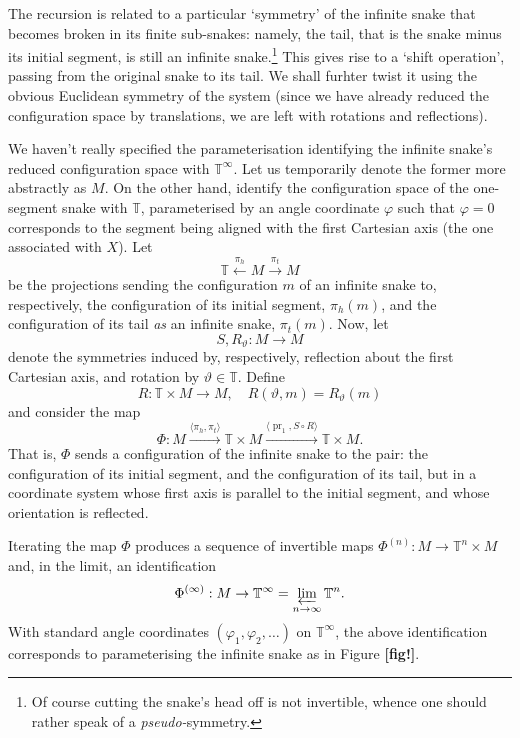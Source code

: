 \documentclass{article}
\def\TT{\mathbb{T}}
\DeclareMathOperator{\pr}{\mathrm{pr}}
\begin{document}
The recursion is related
to a particular `symmetry' of the infinite snake that becomes broken
in its finite sub-snakes:
namely, the tail, that is the
snake minus its initial segment,
is still an infinite snake.\footnote{Of course cutting the snake's head off
is not invertible, whence one should rather speak of a \emph{pseudo-}symmetry.}
This gives rise to a `shift operation', passing from the original snake to its
tail. We shall furhter twist it using the obvious Euclidean symmetry of the system
(since we have already reduced the configuration space by translations,
we are left with rotations and reflections). 

We haven't really specified the parameterisation identifying the infinite snake's
reduced configuration space with $\TT^\infty$. Let us temporarily denote the
former more abstractly as $M$. On the other hand, identify the configuration space
of the one-segment snake with $\TT$, parameterised by an angle coordinate $\varphi$
such that $\varphi=0$ corresponds to the segment being aligned with the first
Cartesian axis (the one associated with $X$). Let $$ \TT \xleftarrow{\pi_h} M \xrightarrow{\pi_t} M $$
be the projections sending the configuration $m$ of an infinite snake 
to, respectively, the configuration of its initial segment, $\pi_h(m)$,
and the configuration
of its tail \emph{as} an infinite snake, $\pi_t(m)$.
Now, let $$ S, R_\vartheta : M \to M $$
denote the symmetries induced by, respectively,
reflection about the first Cartesian axis, and
rotation by $\vartheta \in \TT$. Define
$$ R : \TT \times M \to M,\quad R(\vartheta, m) = R_\vartheta(m) $$ 
and 
consider the map
$$
\Phi : M \xrightarrow{\langle \pi_h,\pi_t\rangle} \TT \times M
\xrightarrow{\langle \pr_1, S \circ R\rangle} \TT \times M.
$$
That is, $\Phi$ sends a configuration of the infinite snake
to the pair: the configuration of its initial segment, and
the configuration of its tail, but in a coordinate system
whose first axis is parallel to the initial segment, and
whose orientation is reflected.

Iterating the map $\Phi$ produces a sequence of invertible maps
$\Phi^{(n)} : M \to \TT^n \times M$ and, in the limit,
an identification 
$$\Phi^{(\infty)} : M \to \TT^\infty = \varprojlim_{n\to\infty} \TT^n.$$
With standard angle coordinates $(\varphi_1,\varphi_2,\dots)$ on $\TT^\infty$,
the above identification corresponds to parameterising the infinite snake
as in Figure \textbf{[fig!]}.
\end{document}
